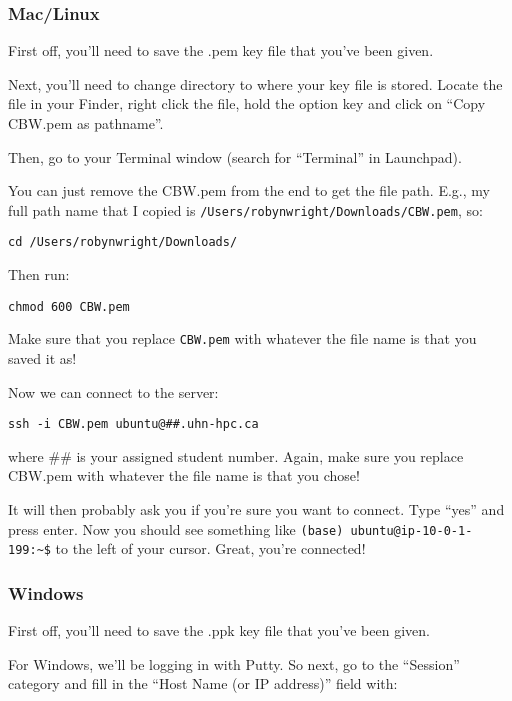 \documentclass[
]{book}
\begin{document}
\subsubsection{Mac/Linux}\label{maclinux}

First off, you'll need to save the .pem key file that you've been given.

Next, you'll need to change directory to where your key file is stored. Locate the file in your Finder, right click the file, hold the option key and click on ``Copy CBW.pem as pathname''.

Then, go to your Terminal window (search for ``Terminal'' in Launchpad).

You can just remove the CBW.pem from the end to get the file path. E.g., my full path name that I copied is \texttt{/Users/robynwright/Downloads/CBW.pem}, so:

\begin{verbatim}
cd /Users/robynwright/Downloads/
\end{verbatim}

Then run:

\begin{verbatim}
chmod 600 CBW.pem
\end{verbatim}

Make sure that you replace \texttt{CBW.pem} with whatever the file name is that you saved it as!

Now we can connect to the server:

\begin{verbatim}
ssh -i CBW.pem ubuntu@##.uhn-hpc.ca
\end{verbatim}

where \#\# is your assigned student number. Again, make sure you replace CBW.pem with whatever the file name is that you chose!

It will then probably ask you if you're sure you want to connect. Type ``yes'' and press enter. Now you should see something like \texttt{(base)\ ubuntu@ip-10-0-1-199:\textasciitilde{}\$} to the left of your cursor. Great, you're connected!

\subsubsection{Windows}\label{windows}

First off, you'll need to save the .ppk key file that you've been given.

For Windows, we'll be logging in with Putty. So next, go to the ``Session'' category and fill in the ``Host Name (or IP address)'' field with:
\end{document}
